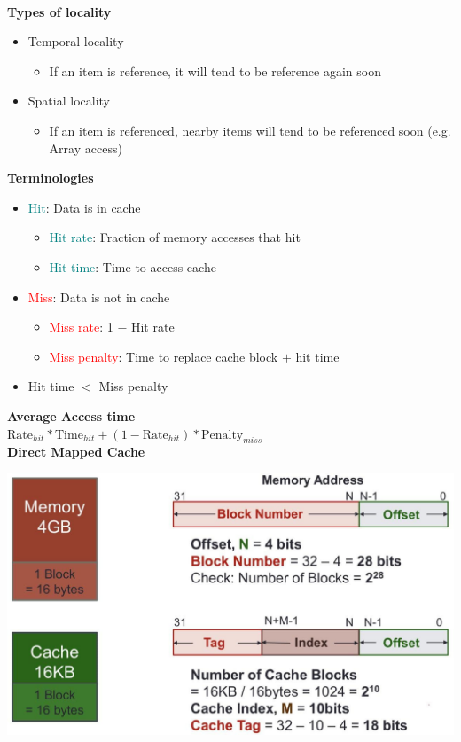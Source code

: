 \documentclass[a4paper]{article} \usepackage[backend=biber, style=numeric, sorting=none]{biblatex}
\begin{document}
\begin{multicols*}{4}
\textbf{\\Types of locality}
\begin{itemize}
    \item Temporal locality
    \begin{itemize}
        \item If an item is reference, it will tend to be reference again soon
    \end{itemize}
    \item Spatial locality
    \begin{itemize}
        \item If an item is referenced, nearby items will tend to be referenced soon (e.g. Array access)\\
    \end{itemize}
\end{itemize}

\textbf{Terminologies}
\begin{itemize}
    \item \textcolor{teal}{Hit}: Data is in cache
    \begin{itemize}
        \item \textcolor{teal}{Hit rate}: Fraction of memory accesses that hit
        \item \textcolor{teal}{Hit time}: Time to access cache
    \end{itemize}
    \item \textcolor{red}{Miss}: Data is not in cache
    \begin{itemize}
        \item \textcolor{red}{Miss rate}: 1 $-$ Hit rate
        \item \textcolor{red}{Miss penalty}: Time to replace cache block $+$ hit time
    \end{itemize}
    \item Hit time $<$ Miss penalty\\
\end{itemize}

\textbf{Average Access time}
\\ $\text{Rate}_{hit} * \text{Time}_{hit} + (1 - \text{Rate}_{hit}) * \text{Penalty}_{miss}$\\

\textbf{{Direct Mapped Cache}}
\begin{center}
    \includegraphics[scale=0.13]{direct_map}
\end{center}


\end{multicols*}
\end{document}
